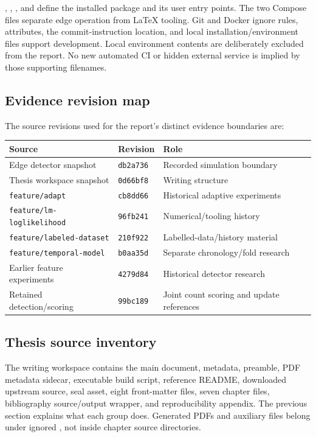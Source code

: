 , , , and 
define the installed package and its user entry points. The two Compose files
separate edge operation from LaTeX tooling. Git and Docker ignore rules,
attributes, the commit-instruction location, and local installation/environment
files support development. Local environment contents are deliberately excluded
from the report. No new automated CI or hidden external service is implied by
those supporting filenames.

\subsection{Evidence revision map}

The source revisions used for the report's distinct evidence boundaries are:
\begin{center}
\small
\begin{tabular}{lll}
\toprule
\textbf{Source} & \textbf{Revision} & \textbf{Role} \\
\midrule
Edge detector snapshot & \texttt{db2a736} & Recorded simulation boundary \\
Thesis workspace snapshot & \texttt{0d66bf8} & Writing structure \\
\texttt{feature/adapt} & \texttt{cb8dd66} & Historical adaptive experiments \\
\texttt{feature/lm-loglikelihood} & \texttt{96fb241} & Numerical/tooling history \\
\texttt{feature/labeled-dataset} & \texttt{210f922} & Labelled-data/history material \\
\texttt{feature/temporal-model} & \texttt{b0aa35d} & Separate chronology/fold research \\
Earlier feature experiments & \texttt{4279d84} & Historical detector research \\
Retained detection/scoring & \texttt{99bc189} & Joint count scoring and update references \\
\bottomrule
\end{tabular}
\end{center}

\subsection{Thesis source inventory}

The writing workspace contains the main document, metadata, preamble,
PDF metadata sidecar, executable build script, reference README, downloaded
upstream source, seal asset, eight front-matter files, seven chapter files,
bibliography source/output wrapper, and reproducibility appendix. The previous
section explains what each group does. Generated PDFs and auxiliary files
belong under ignored , not inside chapter source directories.
